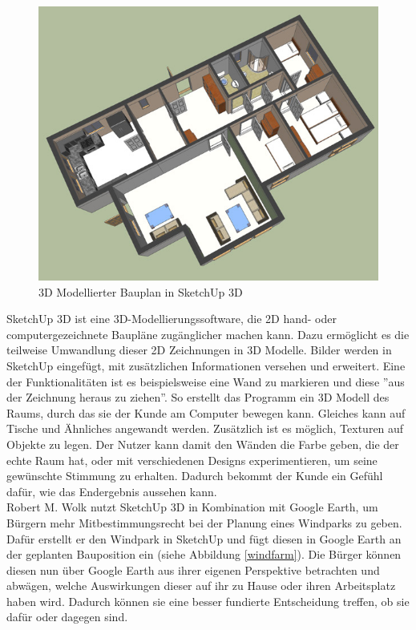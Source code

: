 \begin{figure}[H]
	\begin{center}
		\includegraphics[scale=0.65]{Resources/Hintergrund/sketchup.jpg}
		\caption{3D Modellierter Bauplan in SketchUp 3D}
	\end{center}
\end{figure}

SketchUp 3D ist eine 3D-Modellierungssoftware, die 2D hand- oder computergezeichnete Baupläne zugänglicher machen kann. Dazu ermöglicht es die teilweise Umwandlung dieser 2D Zeichnungen in 3D Modelle. Bilder werden in SketchUp eingefügt, mit zusätzlichen Informationen versehen und erweitert. Eine der Funktionalitäten ist es beispielsweise eine Wand zu markieren und diese ''aus der Zeichnung heraus zu ziehen''. So erstellt das Programm ein 3D Modell des Raums, durch das sie der Kunde am Computer bewegen kann. Gleiches kann auf Tische und Ähnliches angewandt werden. Zusätzlich ist es möglich, Texturen auf Objekte zu legen. Der Nutzer kann damit den Wänden die Farbe geben, die der echte Raum hat, oder mit verschiedenen Designs experimentieren, um seine gewünschte Stimmung zu erhalten. Dadurch bekommt der Kunde ein Gefühl dafür, wie das Endergebnis aussehen kann. \\
Robert M. Wolk \cite{wolk_utilizing_2008} nutzt SketchUp 3D in Kombination mit Google Earth, um Bürgern mehr Mitbestimmungsrecht bei der Planung eines Windparks zu geben. Dafür erstellt er den Windpark in SketchUp und fügt diesen in Google Earth an der geplanten Bauposition ein (siehe Abbildung \ref{windfarm}). Die Bürger können diesen nun über Google Earth aus ihrer eigenen Perspektive betrachten und abwägen, welche Auswirkungen dieser auf ihr zu Hause oder ihren Arbeitsplatz haben wird. Dadurch können sie eine besser fundierte Entscheidung treffen, ob sie dafür oder dagegen sind.

